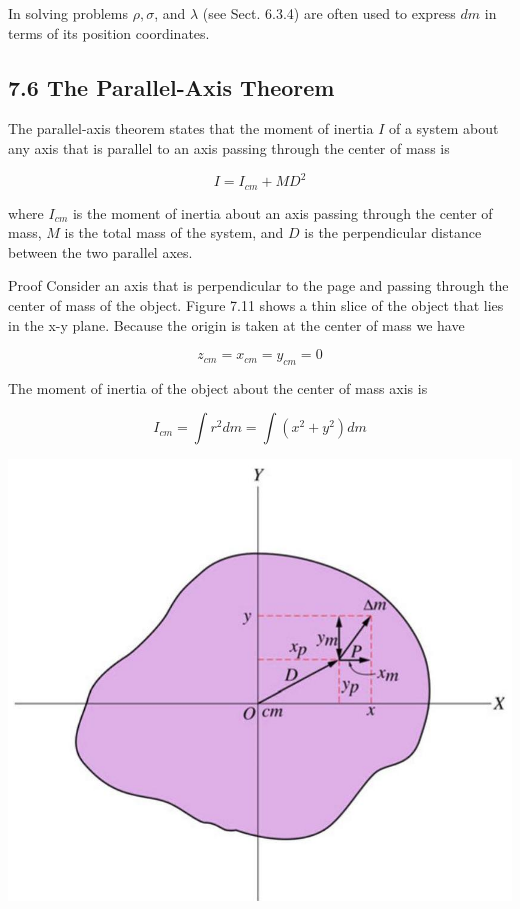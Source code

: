 \documentclass[10pt]{article}
\begin{document}
In solving problems $\rho, \sigma$, and $\lambda$ (see Sect. 6.3.4) are often used to express $d m$ in terms of its position coordinates.

\subsection*{7.6 The Parallel-Axis Theorem}
The parallel-axis theorem states that the moment of inertia $I$ of a system about any axis that is parallel to an axis passing through the center of mass is

$$
I=I_{c m}+M D^{2}
$$

where $I_{c m}$ is the moment of inertia about an axis passing through the center of mass, $M$ is the total mass of the system, and $D$ is the perpendicular distance between the two parallel axes.

Proof Consider an axis that is perpendicular to the page and passing through the center of mass of the object. Figure 7.11 shows a thin slice of the object that lies in the x-y plane. Because the origin is taken at the center of mass we have

$$
z_{c m}=x_{c m}=y_{c m}=0
$$

The moment of inertia of the object about the center of mass axis is

$$
I_{c m}=\int r^{2} d m=\int\left(x^{2}+y^{2}\right) d m
$$

\begin{center}
\includegraphics[max width=\textwidth]{2024_09_13_db1f357d2aad0a03eb2eg-117}
\end{center}
\end{document}
